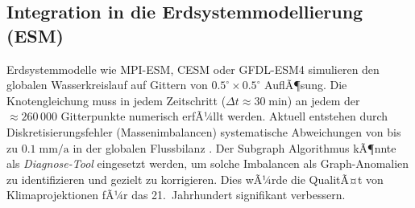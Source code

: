 ﻿\documentclass[a4paper,12pt]{article}
\theoremstyle{definition}
\begin{document}
\subsection{Integration in die Erdsystemmodellierung (ESM)}

Erdsystemmodelle wie MPI-ESM, CESM oder GFDL-ESM4 simulieren den globalen
Wasserkreislauf auf Gittern von $0.5^\circ \times 0.5^\circ$ AuflÃ¶sung.
Die Knotengleichung muss in jedem Zeitschritt ($\Delta t \approx 30\;\text{min}$)
an jedem der $\approx 260\,000$ Gitterpunkte numerisch erfÃ¼llt werden.
Aktuell entstehen durch Diskretisierungsfehler (Massenimbalancen)
systematische Abweichungen von bis zu $0.1\;\text{mm}/\text{a}$ in der
globalen Flussbilanz \cite{hersbach2020}. Der Subgraph Algorithmus kÃ¶nnte
als \emph{Diagnose-Tool} eingesetzt werden, um solche Imbalancen als
Graph-Anomalien zu identifizieren und gezielt zu korrigieren. Dies wÃ¼rde
die QualitÃ¤t von Klimaprojektionen fÃ¼r das 21.\ Jahrhundert signifikant
verbessern.
\end{document}
